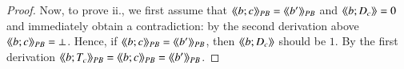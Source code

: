 \begin{proof}
Now, to prove ii., we first assume that $\osemPB{b;c}=\osemPB{b'}$ and $\osem{b;D_c}=0$ and immediately obtain a contradiction: by the second derivation above $\osemPB{b;c}=\bot$. Hence, if  $\osemPB{b;c}=\osemPB{b'}$, then $\osem{b;D_c}$ should be $1$. By the first derivation $\osemPB{b;T_c}=\osemPB{b;c}=\osemPB{b'}$.


%
% 

\end{proof}

